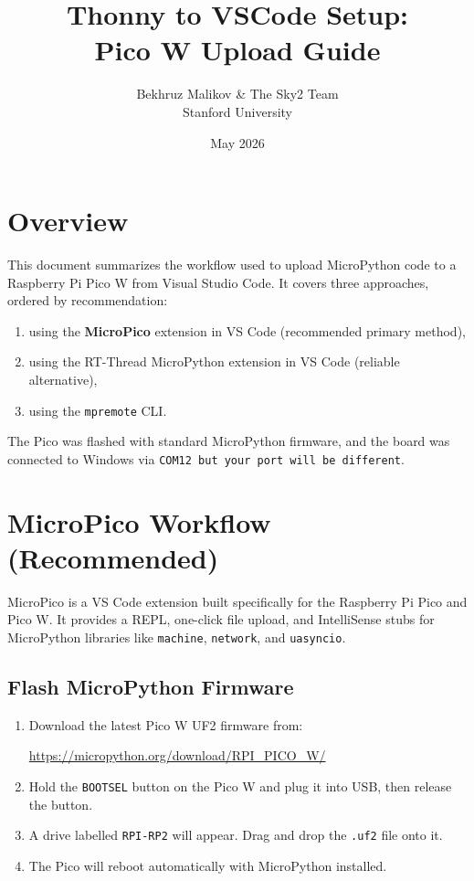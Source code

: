 \documentclass[11pt,a4paper]{article}
\title{ \textbf{Thonny to VSCode Setup:} \\ Pico W Upload Guide}
\author{Bekhruz Malikov \& The Sky2 Team \\
Stanford University}
\date{May 2026}
\begin{document}
\maketitle
\section*{Overview}
This document summarizes the workflow used to upload MicroPython code to a Raspberry Pi Pico W from Visual Studio Code. It covers three approaches, ordered by recommendation:
\begin{enumerate}
  \item using the \textbf{MicroPico} extension in VS Code (recommended primary method),
  \item using the RT-Thread MicroPython extension in VS Code (reliable alternative),
  \item using the \texttt{mpremote} CLI.
\end{enumerate}
The Pico was flashed with standard MicroPython firmware, and the board was connected to Windows via \texttt{COM12 but your port will be different}.

\section{MicroPico Workflow (Recommended)}
MicroPico is a VS Code extension built specifically for the Raspberry Pi Pico and Pico W. It provides a REPL, one-click file upload, and IntelliSense stubs for MicroPython libraries like \texttt{machine}, \texttt{network}, and \texttt{uasyncio}.

\subsection{Flash MicroPython Firmware}
\begin{enumerate}[leftmargin=*]
  \item Download the latest Pico W UF2 firmware from:
    \begin{center}
      \url{https://micropython.org/download/RPI_PICO_W/}
    \end{center}
  \item Hold the \texttt{BOOTSEL} button on the Pico W and plug it into USB, then release the button.
  \item A drive labelled \texttt{RPI-RP2} will appear. Drag and drop the \texttt{.uf2} file onto it.
  \item The Pico will reboot automatically with MicroPython installed.
\end{enumerate}
\end{document}
